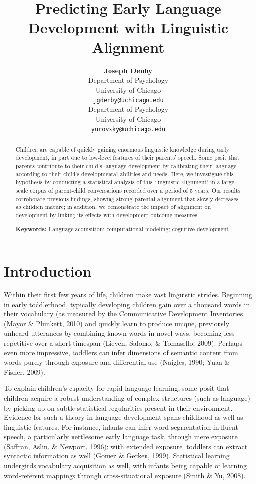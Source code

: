 \documentclass[10pt, letterpaper]{article}
\title{Predicting Early Language Development with Linguistic Alignment}
\author{{\large \bf Joseph Denby} \\ Department of Psychology \\ University of Chicago \\ \texttt{jgdenby@uchicago.edu} \And {\large \bf Daniel Yurovsky} \\ Department of Psychology\\ University of Chicago \\\texttt{yurovsky@uchicago.edu}}
\begin{document}
\maketitle

\begin{abstract}
Children are capable of quickly gaining enormous linguistic knowledge
during early development, in part due to low-level features of their
parents' speech. Some posit that parents contribute to their child's
language development by calibrating their language according to their
child's developmental abilities and needs. Here, we investigate this
hypothesis by conducting a statistical analysis of this `linguistic
alignment' in a large-scale corpus of parent-child conversations
recorded over a period of 5 years. Our results corroborate previous
findings, showing strong parental alignment that slowly decreases as
children mature; in addition, we demonstrate the impact of alignment on
development by linking its effects with development outcome measures.

\textbf{Keywords:}
Language acquisition; computational modeling; cognitive development
\end{abstract}

\hypertarget{introduction}{%
\section{Introduction}\label{introduction}}

Within their first few years of life, children make vast linguistic
strides. Beginning in early toddlerhood, typically developing children
gain over a thousand words in their vocabulary (as measured by the
Communicative Development Inventories (Mayor \& Plunkett, 2010) and
quickly learn to produce unique, previously unheard utterances by
combining known words in novel ways, becoming less repetitive over a
short timespan (Lieven, Salomo, \& Tomasello, 2009). Perhaps even more
impressive, toddlers can infer dimensions of semantic content from words
purely through exposure and differential use (Naigles, 1990; Yuan \&
Fisher, 2009).

To explain children's capacity for rapid language learning, some posit
that children acquire a robust understanding of complex structures (such
as language) by picking up on subtle statistical regularities present in
their environment. Evidence for such a theory in language development
spans childhood as well as linguistic features. For instance, infants
can infer word segmentation in fluent speech, a particularly nettlesome
early language task, through mere exposure (Saffran, Aslin, \& Newport,
1996); with extended exposure, toddlers can extract syntactic
information as well (Gomez \& Gerken, 1999). Statistical learning
undergirds vocabulary acquisition as well, with infants being capable of
learning word-referent mappings through cross-situational exposure
(Smith \& Yu, 2008).
\end{document}
